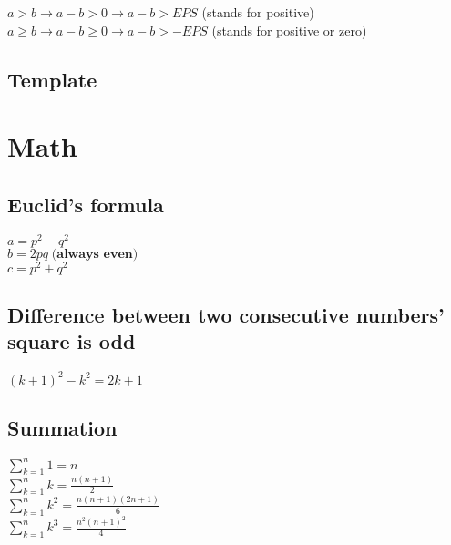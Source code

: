 \documentclass[10pt,oneside]{article}
\begin{document}
\begin{landscape}
\begin{multicols}{2}
$a > b \rightarrow a - b > 0 \rightarrow a - b > EPS$ (stands for positive)\\
$a \geq b \rightarrow  a - b \geq 0 \rightarrow a - b > -EPS$ (stands for positive or zero)\\

\subsection{Template}

% 


\section{Math}

\subsection{Euclid's formula}

$a = p^2 - q^2 $\\
$b = 2pq \; \textbf{(always even)}$ \\
$c = p^2 + q^2$\\

\subsection{Difference between two consecutive numbers' square is odd}

$(k + 1)^2 - k^2 = 2k + 1$

\subsection{Summation}

$\sum_{k=1}^{n} 1= n$\\
$\sum_{k=1}^{n} k= \frac{n(n+1)}{2}$\\
$\sum_{k=1}^{n} k^2= \frac{n(n+1)(2n+1)}{6}$\\
$\sum_{k=1}^{n} k^3= \frac{n^2(n+1)^2}{4}$\\

\end{multicols}
\end{landscape}
\end{document}
